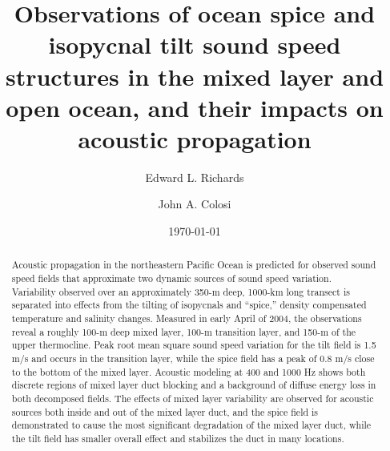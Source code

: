 \documentclass[preprint,NumberedRefs]{JASA}
\begin{document}
\title[Mixed layer tilt and spice]{Observations of ocean spice and isopycnal tilt sound speed structures in the mixed layer and open ocean, and their impacts on acoustic propagation}
\author{Edward L. Richards}
\author{John A. Colosi}


\date{\today}

\begin{abstract}
Acoustic propagation in the northeastern Pacific Ocean is predicted for observed sound speed fields that approximate two dynamic sources of sound speed variation. Variability observed over an approximately 350-m deep, 1000-km long transect is separated into effects from the tilting of isopycnals and “spice,” density compensated temperature and salinity changes. Measured in early April of 2004, the observations reveal a roughly 100-m deep mixed layer, 100-m transition layer, and 150-m of the upper thermocline. Peak root mean square sound speed variation for the tilt field is 1.5 m/s and occurs in the transition layer, while the spice field has a peak of 0.8 m/s close to the bottom of the mixed layer. Acoustic modeling at 400 and 1000 Hz shows both discrete regions of mixed layer duct blocking and a background of diffuse energy loss in both decomposed fields. The effects of mixed layer variability are observed for acoustic sources both inside and out of the mixed layer duct, and the spice field is demonstrated to cause the most significant degradation of the mixed layer duct, while the tilt field has smaller overall effect and stabilizes the duct in many locations.
\end{abstract}

\maketitle
\end{document}
